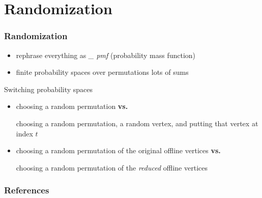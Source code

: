 \documentclass{beamer}
\begin{document}
\begin{frame}
\end{frame}


\section{Randomization}
\begin{frame}
  \frametitle{Randomization}
  \begin{itemize}[<+->]
    \item rephrase everything as \emph{\_ pmf} (probability mass function)
    \item finite probability spaces over permutations \textrightarrow{} lots of sums
  \end{itemize}
  \onslide<+->
  \begin{alertblock}{Switching probability spaces}
    \begin{itemize}[<+->]
      \item choosing a random permutation \textbf{vs.}
      
      choosing a random permutation, a random vertex, and putting that vertex at index $t$
      \item choosing a random permutation of the original offline vertices \textbf{vs.}
      
      choosing a random permutation of the \emph{reduced} offline vertices
    \end{itemize}
  \end{alertblock}
\end{frame}

\begin{frame}
  \frametitle{References}
  
  
\end{frame}
\end{document}
